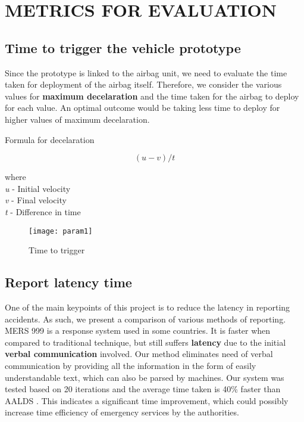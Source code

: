 \chapter{METRICS FOR EVALUATION}

\section{Time to trigger the vehicle prototype}

Since the prototype is linked to the airbag unit, we need to evaluate the time taken for deployment of the airbag itself. Therefore, we consider the various values for \textbf{maximum decelaration} and the time taken for the airbag to deploy for each value. An optimal outcome would be taking less time to deploy for higher values of maximum decelaration.

Formula for decelaration

\[ (u - v) / t \]

where \\
\textit{u} - Initial velocity \\
\textit{v} - Final velocity \\
\textit{t} - Difference in time
		

\begin{figure}[h!]
	\centering
	\texttt{[image: param1]}
	\caption{Time to trigger}
	\label{fig:param1}
\end{figure}

\hfill
\pagebreak
\section{Report latency time}

One of the main keypoints of this project is to reduce the latency in reporting accidents. As such, we present a comparison of various methods of reporting. MERS 999 \cite{aalds} is a response system used in some countries. It is faster when compared to traditional technique, but still suffers \textbf{latency} due to the initial \textbf{verbal communication} involved. Our method eliminates need of verbal communication by providing all the information in the form of easily understandable text, which can also be parsed by machines. Our system was tested based on 20 iterations and the average time taken is 40\% faster than AALDS \cite{aalds}. This indicates a significant time improvement, which could possibly increase time efficiency of emergency services by the authorities.

\hfill

